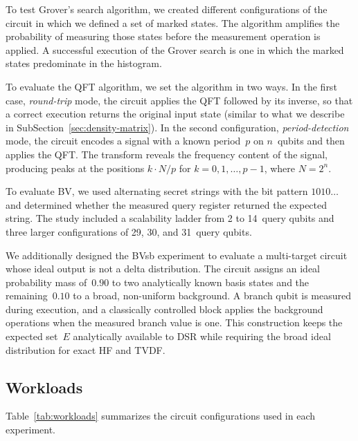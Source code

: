 \documentclass[10pt,conference]{IEEEtran}
\begin{document}
To test Grover's search algorithm, we created different configurations of the circuit in which we defined a set of marked states. The algorithm amplifies the probability of measuring those states before the measurement operation is applied. A successful execution of the Grover search is one in which the marked states predominate in the histogram.

To evaluate the QFT algorithm, we set the algorithm in two ways. In the first case, \emph{round-trip} mode, the circuit applies the QFT followed by its inverse, so that a correct execution returns the original input state (similar to what we describe in SubSection~\ref{sec:density-matrix}). In the second configuration, \emph{period-detection} mode, the circuit encodes a signal with a known period~$p$ on $n$~qubits and then applies the QFT. The transform reveals the frequency content of the signal, producing peaks at the positions $k \cdot N/p$ for $k = 0, 1, \ldots, p{-}1$, where $N = 2^n$.

To evaluate BV, we used alternating secret strings with the bit pattern $1010\ldots$ and determined whether the measured query register returned the expected string. The study included a scalability ladder from 2 to 14~query qubits and three larger configurations of 29, 30, and 31~query qubits.

We additionally designed the BVsb experiment to evaluate a multi-target circuit whose ideal output is not a delta distribution. The circuit assigns an ideal probability mass of~$0.90$ to two analytically known basis states and the remaining~$0.10$ to a broad, non-uniform background. A branch qubit is measured during execution, and a classically controlled block applies the background operations when the measured branch value is one. This construction keeps the expected set~$E$ analytically available to DSR while requiring the broad ideal distribution for exact HF and TVDF.

\subsection{Workloads}

Table~\ref{tab:workloads} summarizes the circuit configurations used in each experiment.
\end{document}
